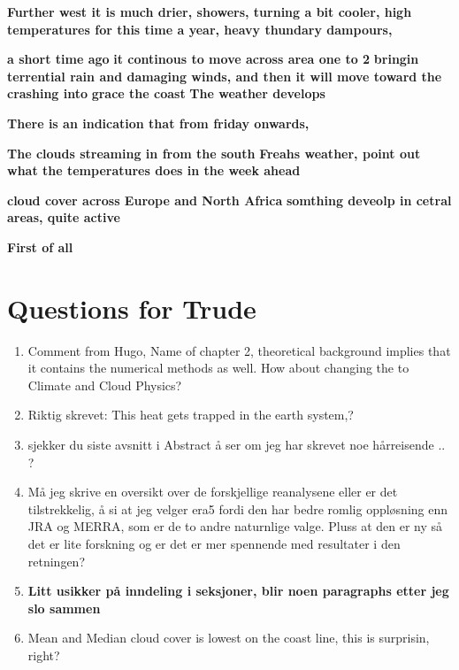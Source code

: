 \textbf{Further west it is much drier, showers, turning a bit cooler, high temperatures for this time a year, heavy thundary dampours, }

\textbf{a short time ago}
\textbf{it continous to move across area one to 2}
\textbf{bringin terrential rain and damaging winds, and then it will move toward the }
\textbf{crashing into }
\textbf{grace the coast}
\textbf{The weather develops}

\textbf{There is an indication that from friday onwards, }

\textbf{The clouds streaming in from the south}
\textbf{Freahs weather, point out what the temperatures does in the week ahead}

\textbf{cloud cover across Europe and North Africa}
\textbf{somthing deveolp in cetral areas, quite active}

\textbf{First of all}


\section{Questions for Trude}
\begin{enumerate}
    \item Comment from Hugo, Name of chapter 2, theoretical background implies that it contains the numerical methods as well. How about changing the to Climate and Cloud Physics?
    \item Riktig skrevet: This heat gets trapped in the earth system,?
    \item sjekker du siste avsnitt i Abstract å ser om jeg har skrevet noe hårreisende .. ?
    \item Må jeg skrive en oversikt over de forskjellige reanalysene eller er det tilstrekkelig, å si at jeg velger \acrshort{era5} fordi den har bedre romlig oppløsning enn JRA og MERRA, som er de to andre naturnlige valge. Pluss at den er ny så det er lite forskning og er det er mer spennende med resultater i den retningen?
    \item \textbf{Litt usikker på inndeling i seksjoner, blir noen paragraphs etter jeg slo sammen }
    \item Mean and Median cloud cover is lowest on the coast line, this is surprisin, right?
\end{enumerate}




